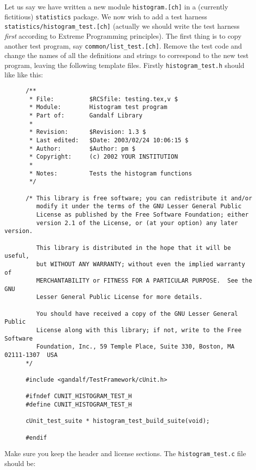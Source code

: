 Let us say we have written a new module {\tt histogram.[ch]} in a
(currently fictitious) {\tt statistics} package. We now wish
to add a test harness {\tt statistics/histogram\_test.[ch]}
(actually we should write the test harness {\em first} according to
Extreme Programming principles). The first thing is to copy another test
program, say {\tt common/list\_test.[ch]}. Remove the test code and change
the names of all the definitions and strings to correspond to the new
test program, leaving the following template files.
Firstly {\tt histogram\_test.h} should like like this:
\begin{verbatim}
      /**
       * File:          $RCSfile: testing.tex,v $
       * Module:        Histogram test program
       * Part of:       Gandalf Library
       *
       * Revision:      $Revision: 1.3 $
       * Last edited:   $Date: 2003/02/24 10:06:15 $
       * Author:        $Author: pm $
       * Copyright:     (c) 2002 YOUR INSTITUTION
       *
       * Notes:         Tests the histogram functions
       */

      /* This library is free software; you can redistribute it and/or
         modify it under the terms of the GNU Lesser General Public
         License as published by the Free Software Foundation; either
         version 2.1 of the License, or (at your option) any later version.

         This library is distributed in the hope that it will be useful,
         but WITHOUT ANY WARRANTY; without even the implied warranty of
         MERCHANTABILITY or FITNESS FOR A PARTICULAR PURPOSE.  See the GNU
         Lesser General Public License for more details.

         You should have received a copy of the GNU Lesser General Public
         License along with this library; if not, write to the Free Software
         Foundation, Inc., 59 Temple Place, Suite 330, Boston, MA  02111-1307  USA
      */

      #include <gandalf/TestFramework/cUnit.h>

      #ifndef CUNIT_HISTOGRAM_TEST_H
      #define CUNIT_HISTOGRAM_TEST_H

      cUnit_test_suite * histogram_test_build_suite(void);

      #endif
\end{verbatim}
Make sure you keep the header and license sections. The {\tt histogram\_test.c}
file should be:
